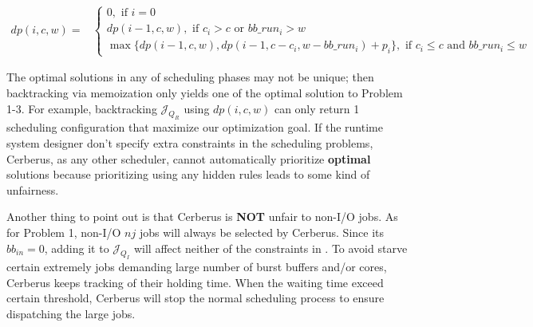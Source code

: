 \begin{strip}
        \begin{align}
                dp(i, c, w) = &
                \left\{
                        \begin{array}{l}
                                0, \text{ if $i=0$ } \\ [0.6em]
                                dp(i-1, c, w), \text{ if $c_i > c$ or $bb\_run_i > w$} \\ [0.6em]
                                \max \{ dp(i-1, c, w), dp(i-1, c - c_i, w - bb\_run_i) + p_i \}, \text{ if $c_i \leq c$ and $bb\_run_i \leq w$}
                        \end{array} 
                \right.
                \label{Equ:MaxProductRecursion}
        \end{align}
\end{strip}


The optimal solutions in any of scheduling phases may not be unique;
then backtracking via memoization only yields one of the optimal solution to Problem 1-3.
For example, backtracking $\mathcal{J}_{Q_R}$ using $dp(i,c,w)$ can only return 1 scheduling
configuration that maximize our optimization goal.
If the runtime system designer don't specify extra constraints in the scheduling problems,
Cerberus, as any other scheduler, cannot automatically prioritize \textbf{optimal} solutions
because prioritizing using any hidden rules leads to some kind of unfairness.

Another thing to point out is that Cerberus is \textbf{NOT} unfair to non-I/O jobs.
As for Problem 1, non-I/O $nj$ jobs will always be selected by Cerberus.
Since its $bb_{in} = 0$, adding it to $\mathcal{J}_{Q_I}$ will affect
neither of the constraints in .
To avoid starve certain extremely jobs demanding large number of burst buffers and/or cores,
Cerberus keeps tracking of their holding time.
When the waiting time exceed certain threshold, Cerberus will stop the normal scheduling
process to ensure dispatching the large jobs.



